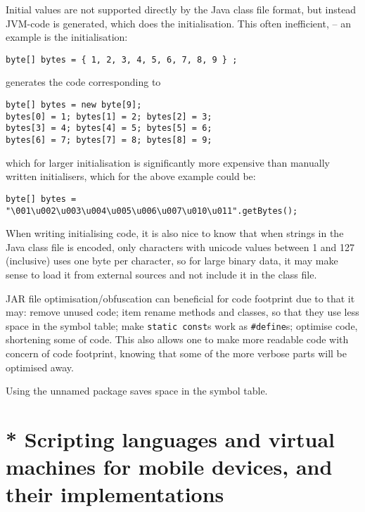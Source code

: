 Initial values are not supported directly by the Java class file format, but instead
JVM-code is generated, which does the initialisation. 
This often inefficient, -- an example is the initialisation:
\begin{verbatim}
byte[] bytes = { 1, 2, 3, 4, 5, 6, 7, 8, 9 } ;
\end{verbatim}
generates the code corresponding to
\begin{verbatim}
byte[] bytes = new byte[9];
bytes[0] = 1; bytes[1] = 2; bytes[2] = 3;
bytes[3] = 4; bytes[4] = 5; bytes[5] = 6;
bytes[6] = 7; bytes[7] = 8; bytes[8] = 9;
\end{verbatim}
which for larger initialisation is significantly more expensive than manually written initialisers,
which for the above example could be:
\begin{verbatim}
byte[] bytes = "\001\u002\u003\u004\u005\u006\u007\u010\u011".getBytes();
\end{verbatim}
When writing initialising code, it is also nice to know that when strings in the Java class file is encoded, only characters with unicode values between 1 and 127 (inclusive) uses one byte per character, so for large binary data, it may make sense to load it from external sources and not include it in the class file.

JAR file optimisation/obfuscation can beneficial for code footprint due to that it may:
remove unused code;
item rename methods and classes, so that they use less space in the symbol table;
make \verb|static const|s work as \verb|#define|s;
optimise code, shortening some of code.
This also allows one to make more readable code with concern of code footprint, knowing that some of the more verbose parts will be optimised away.

Using the unnamed package saves space in the symbol table.

\section{* Scripting languages and virtual machines for mobile devices, and their implementations}


